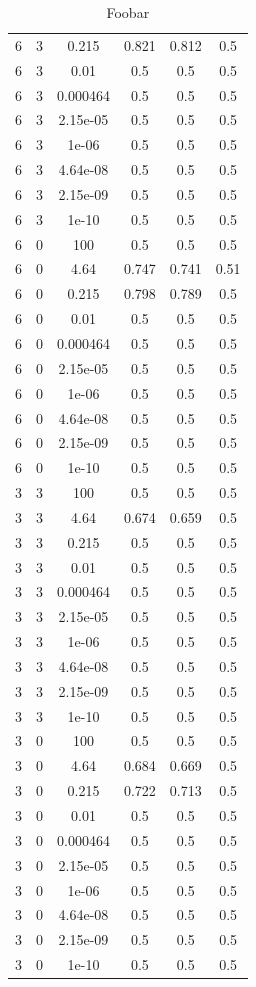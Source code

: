 \begin{table}[ht]
\begin{tabular}{ |c|c|c|c|c|c| }
6 & 3 & 0.215 & 0.821 & 0.812 & 0.5 \\
6 & 3 & 0.01 & 0.5 & 0.5 & 0.5 \\
6 & 3 & 0.000464 & 0.5 & 0.5 & 0.5 \\
6 & 3 & 2.15e-05 & 0.5 & 0.5 & 0.5 \\
6 & 3 & 1e-06 & 0.5 & 0.5 & 0.5 \\
6 & 3 & 4.64e-08 & 0.5 & 0.5 & 0.5 \\
6 & 3 & 2.15e-09 & 0.5 & 0.5 & 0.5 \\
6 & 3 & 1e-10 & 0.5 & 0.5 & 0.5 \\
6 & 0 & 100 & 0.5 & 0.5 & 0.5 \\
6 & 0 & 4.64 & 0.747 & 0.741 & 0.51 \\
6 & 0 & 0.215 & 0.798 & 0.789 & 0.5 \\
6 & 0 & 0.01 & 0.5 & 0.5 & 0.5 \\
6 & 0 & 0.000464 & 0.5 & 0.5 & 0.5 \\
6 & 0 & 2.15e-05 & 0.5 & 0.5 & 0.5 \\
6 & 0 & 1e-06 & 0.5 & 0.5 & 0.5 \\
6 & 0 & 4.64e-08 & 0.5 & 0.5 & 0.5 \\
6 & 0 & 2.15e-09 & 0.5 & 0.5 & 0.5 \\
6 & 0 & 1e-10 & 0.5 & 0.5 & 0.5 \\
3 & 3 & 100 & 0.5 & 0.5 & 0.5 \\
3 & 3 & 4.64 & 0.674 & 0.659 & 0.5 \\
3 & 3 & 0.215 & 0.5 & 0.5 & 0.5 \\
3 & 3 & 0.01 & 0.5 & 0.5 & 0.5 \\
3 & 3 & 0.000464 & 0.5 & 0.5 & 0.5 \\
3 & 3 & 2.15e-05 & 0.5 & 0.5 & 0.5 \\
3 & 3 & 1e-06 & 0.5 & 0.5 & 0.5 \\
3 & 3 & 4.64e-08 & 0.5 & 0.5 & 0.5 \\
3 & 3 & 2.15e-09 & 0.5 & 0.5 & 0.5 \\
3 & 3 & 1e-10 & 0.5 & 0.5 & 0.5 \\
3 & 0 & 100 & 0.5 & 0.5 & 0.5 \\
3 & 0 & 4.64 & 0.684 & 0.669 & 0.5 \\
3 & 0 & 0.215 & 0.722 & 0.713 & 0.5 \\
3 & 0 & 0.01 & 0.5 & 0.5 & 0.5 \\
3 & 0 & 0.000464 & 0.5 & 0.5 & 0.5 \\
3 & 0 & 2.15e-05 & 0.5 & 0.5 & 0.5 \\
3 & 0 & 1e-06 & 0.5 & 0.5 & 0.5 \\
3 & 0 & 4.64e-08 & 0.5 & 0.5 & 0.5 \\
3 & 0 & 2.15e-09 & 0.5 & 0.5 & 0.5 \\
3 & 0 & 1e-10 & 0.5 & 0.5 & 0.5 \\
\hline
\end{tabular}
\caption{Foobar}
\label{table:foobar}
\end{table}


